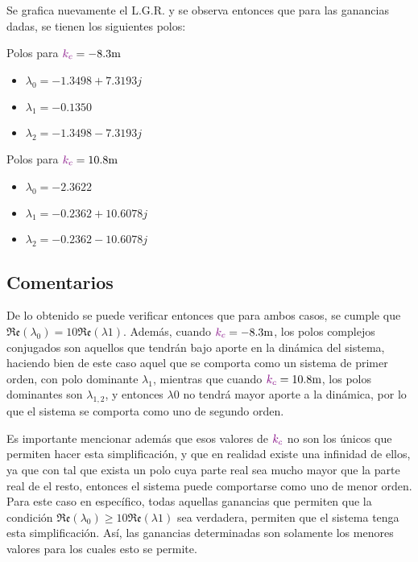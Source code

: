 Se grafica nuevamente el L.G.R. y se observa entonces que para las ganancias dadas,
se tienen los siguientes polos:
\begin{multicols}{2}
    Polos para $\mora{k_{c}} = -8.3\unit{m}$
    \begin{itemize}
        \item $\lambda_{0} = -1.3498 + 7.3193j$
        \item $\lambda_{1} = -0.1350$
        \item $\lambda_{2} = -1.3498 - 7.3193j$
    \end{itemize}

    Polos para $\mora{k_{c}} = 10.8\unit{m}$
    \begin{itemize}
        \item $\lambda_{0} = -2.3622$
        \item $\lambda_{1} = -0.2362 +10.6078j$
        \item $\lambda_{2} = -0.2362 -10.6078j$
    \end{itemize}
\end{multicols}

\FloatBarrier
\subsection{Comentarios}

De lo obtenido se puede verificar entonces que para ambos casos, se cumple que
$\mathfrak{Re}(\lambda_{0}) = 10\mathfrak{Re}(\lambda{1})$. Además, cuando
$\mora{k_{c}} = -8.3\unit{m}$, los polos complejos conjugados son aquellos que
tendrán bajo aporte en la dinámica del sistema, haciendo bien de este caso aquel
que se comporta como un sistema de primer orden, con polo dominante $\lambda_{1}$,
mientras que cuando $\mora{k_{c}} = 10.8\unit{m}$, los polos dominantes son
$\lambda_{1,2}$, y entonces $\lambda{0}$ no tendrá mayor aporte a la dinámica, por
lo que el sistema se comporta como uno de segundo orden.

Es importante mencionar además que esos valores de $\mathbin{\color{violet}k_{c}}$ no son los
únicos que permiten hacer esta simplificación, y que en realidad existe una
infinidad de ellos, ya que con tal que exista un polo cuya parte real sea mucho
mayor que la parte real de el resto, entonces el sistema puede comportarse como
uno de menor orden. Para este caso en específico, todas aquellas ganancias que
permiten que la condición $\mathfrak{Re}(\lambda_{0}) \geq 10\mathfrak{Re}(\lambda{1})$
sea verdadera, permiten que el sistema tenga esta simplificación. Así, las
ganancias determinadas son solamente los menores valores para los cuales esto
se permite.

